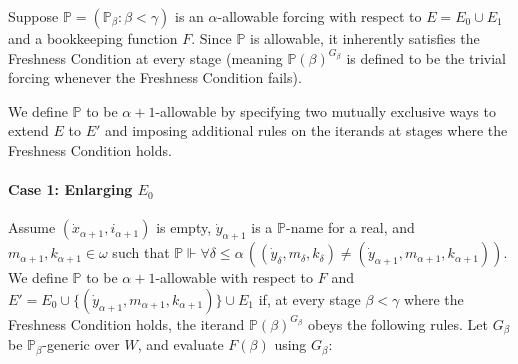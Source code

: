 \documentclass[a4paper,11pt]{article}
\begin{document}
Suppose $\mathbb{P} = (\mathbb{P}_{\beta} : \beta < \gamma)$ is an $\alpha$-allowable forcing with respect to $E = E_0 \cup E_1$ and a bookkeeping function $F$. Since $\mathbb{P}$ is allowable, it inherently satisfies the Freshness Condition at every stage (meaning $\mathbb{P}(\beta)^{G_{\beta}}$ is defined to be the trivial forcing whenever the Freshness Condition fails). 

We define $\mathbb{P}$ to be $\alpha+1$-allowable by specifying two mutually exclusive ways to extend $E$ to $E'$ and imposing additional rules on the iterands at stages where the Freshness Condition holds.

\paragraph{Case 1: Enlarging $E_0$}
Assume $(\dot{x}_{\alpha+1}, i_{\alpha+1})$ is empty, $\dot{y}_{\alpha+1}$ is a $\mathbb{P}$-name for a real, and $m_{\alpha+1}, k_{\alpha+1} \in \omega$ such that $\mathbb{P} \Vdash \forall \delta \le \alpha \, ((\dot{y}_{\delta}, m_{\delta}, k_{\delta}) \ne (\dot{y}_{\alpha+1}, m_{\alpha+1}, k_{\alpha+1}))$. We define $\mathbb{P}$ to be $\alpha+1$-allowable with respect to $F$ and $E' = E_0 \cup \{(\dot{y}_{\alpha+1}, m_{\alpha+1}, k_{\alpha+1})\} \cup E_1$ if, at every stage $\beta < \gamma$ where the Freshness Condition holds, the iterand $\mathbb{P}(\beta)^{G_{\beta}}$ obeys the following rules. Let $G_{\beta}$ be $\mathbb{P}_{\beta}$-generic over $W$, and evaluate $F(\beta)$ using $G_{\beta}$:
\end{document}
